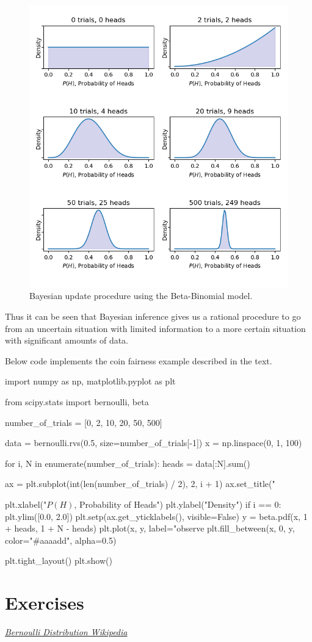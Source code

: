 \begin{figure}[htb]
  \centering
  \includegraphics[width=.7\textwidth]{figures/bayes}
  \caption{Bayesian update procedure using the Beta-Binomial model.}
  \label{fig:bayes}
\end{figure}

Thus it can be seen that Bayesian inference gives us a rational procedure to go from an uncertain situation with limited information to a more certain situation with significant amounts of data.

\begin{finmarkets}
Below code implements the coin fairness example described in the text.
\end{finmarkets}

\begin{ipython}
import numpy as np, matplotlib.pyplot as plt

from scipy.stats import bernoulli, beta

number_of_trials = [0, 2, 10, 20, 50, 500]

data = bernoulli.rvs(0.5, size=number_of_trials[-1])
x = np.linspace(0, 1, 100)

for i, N in enumerate(number_of_trials):
    heads = data[:N].sum()

    ax = plt.subplot(int(len(number_of_trials) / 2), 2, i + 1)
    ax.set_title("%
	
    plt.xlabel("$P(H)$, Probability of Heads")
    plt.ylabel("Density")
    if i == 0:
        plt.ylim([0.0, 2.0])
    plt.setp(ax.get_yticklabels(), visible=False)	
    y = beta.pdf(x, 1 + heads, 1 + N - heads)
    plt.plot(x, y, label="observe %
    plt.fill_between(x, 0, y, color="#aaaadd", alpha=0.5)
    
plt.tight_layout()
plt.show()
\end{ipython}

\section*{Exercises}
%

\begin{thebibliography}{9}
\href{https://en.wikipedia.org/wiki/Bernoulli_distribution}{\emph{Bernoulli Distribution Wikipedia}}
\end{thebibliography}









